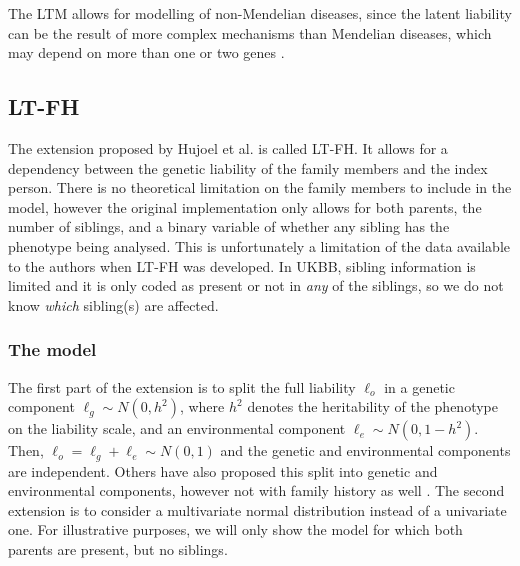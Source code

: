 The LTM allows for modelling of non-Mendelian diseases, since the latent liability can be the result of more complex mechanisms than Mendelian diseases, which may depend on more than one or two genes \cite{falconer1967inheritance,falconer1965inheritance}. 


\subsection{LT-FH}
The extension proposed by Hujoel et al.\cite{hujoel2020liability} is called LT-FH. It allows for a dependency between the genetic liability of the family members and the index person. There is no theoretical limitation on the family members to include in the model, however the original implementation only allows for both parents, the number of siblings, and a binary variable of whether any sibling has the phenotype being analysed. This is unfortunately a limitation of the data available to the authors when LT-FH was developed. In UKBB, sibling information is limited and it is only coded as present or not in \textit{any} of the siblings, so we do not know \textit{which} sibling(s) are affected. 

\subsubsection{The model}

The first part of the extension is to split the full liability $ \ell_o $ in a genetic component $ \ell_g \sim N(0,h^2) $, where $ h^2 $ denotes the heritability of the phenotype on the liability scale, and an environmental component $ \ell_e \sim N(0, 1-h^2) $. Then, $ \ell_o = \ell_g + \ell_e \sim N(0,1) $ and the genetic and environmental components are independent. Others have also proposed this split into genetic and environmental components, however not with family history as well \cite{weissbrod2015accurate}. The second extension is to consider a multivariate normal distribution instead of a univariate one. For illustrative purposes, we will only show the model for which both parents are present, but no siblings. 

